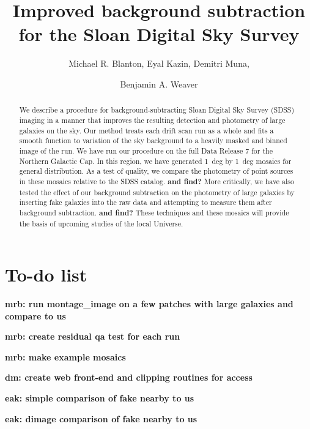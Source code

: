 \documentclass[10pt,preprint]{aastex}
\newcounter{address}
\begin{document}
\title{Improved background subtraction for the Sloan Digital Sky Survey}


\author{
Michael R. Blanton\altaffilmark{\ref{NYU}},
Eyal Kazin\altaffilmark{\ref{NYU}},
Demitri Muna\altaffilmark{\ref{NYU}}, \and
Benjamin A. Weaver\altaffilmark{\ref{NYU}}
}

\setcounter{address}{1}

\begin{abstract}
We describe a procedure for background-subtracting Sloan Digital Sky
Survey (SDSS) imaging in a manner that improves the resulting
detection and photometry of large galaxies on the sky. Our method
treats each drift scan run as a whole and fits a smooth function to
variation of the sky background to a heavily masked and binned image
of the run. We have run our procedure on the full Data Release 7 for
the Northern Galactic Cap. In this region, we have generated 1~deg by
1~deg mosaics for general distribution. As a test of quality, we
compare the photometry of point sources in these mosaics relative to
the SDSS catalog. {\bf and find?} More critically, we have also tested
the effect of our background subtraction on the photometry of large
galaxies by inserting fake galaxies into the raw data and attempting
to measure them after background subtraction. {\bf and find?} These
techniques and these mosaics will provide the basis of upcoming
studies of the local Universe.
\end{abstract}

\section{ To-do list}

{\bf mrb: run montage\_image on a few patches with large galaxies and
compare to us}

{\bf mrb: create residual qa test for each run}

{\bf mrb: make example mosaics}

{\bf dm: create web front-end and clipping routines for access}

{\bf eak: simple comparison of fake nearby to us}

{\bf eak: dimage comparison of fake nearby to us}
\end{document}
